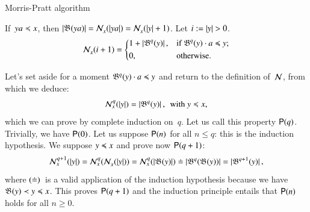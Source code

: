 %
\begin{frame}{Morris-Pratt algorithm}

If~\({ya \mathrel{\preccurlyeq} x}\), then \(\left\lvert\smash{\mathfrak{B}^{}(ya)}\right\rvert =
\mathcal{N}_{x}^{}(\left\lvert\smash{ya}\right\rvert) = \mathcal{N}_{x}^{}(\left\lvert\smash{y}\right\rvert+1)\). Let \(i :=
\left\lvert\smash{y}\right\rvert > 0\).
\begin{equation*}
\mathcal{N}_{x}^{}(i+1) =
\left\{
  \begin{aligned}
   & 1 + \left\lvert\smash{\mathfrak{B}^{q}(y)}\right\rvert,
   && \text{if \(\mathfrak{B}^{q}(y) \cdot a \mathrel{\preccurlyeq}y\)};\\
   & 0,
   && \text{otherwise.}
  \end{aligned}
\right.
\end{equation*}

Let's set aside for a moment \(\mathfrak{B}^{q}(y) \cdot a \mathrel{\preccurlyeq} y\) and
return to the definition of~\(\mathcal{N}\), from which we deduce:
\begin{equation*}
\mathcal{N}_{x}^{q}(\left\lvert\smash{y}\right\rvert) = \left\lvert\smash{\mathfrak{B}^{q}(y)}\right\rvert,
\,\; \text{with \(y \mathrel{\preccurlyeq}x\)},
\end{equation*}
which we can prove by complete induction on~\(q\). Let us call this
property \(\textsf{P}({q})\). Trivially, we have \(\textsf{P}({0})\). Let us
suppose \(\textsf{P}({n})\) for all \(n \leqslant q\): this is the
induction hypothesis. We suppose \(y \mathrel{\preccurlyeq} x\) and prove now
\(\textsf{P}({q+1})\):
\begin{equation*}
  \mathcal{N}_{x}^{q+1}(\left\lvert\smash{y}\right\rvert)
= \mathcal{N}_{x}^{q}(\mathcal{N}_{x}^{}(\left\lvert\smash{y}\right\rvert))
= \mathcal{N}_{x}^{q}(\left\lvert\smash{\mathfrak{B}^{}(y)}\right\rvert)
\doteq \left\lvert\smash{\mathfrak{B}^{q}(\mathfrak{B}^{}(y))}\right\rvert
= \left\lvert\smash{\mathfrak{B}^{q+1}(y)}\right\rvert,
\end{equation*}
where \((\smash{\doteq})\)~is a valid application of the induction
hypothesis because we have \(\mathfrak{B}^{}(y) \mathrel{\prec} y \mathrel{\preccurlyeq} x\). This
proves \(\textsf{P}({q+1})\) and the induction principle entails that
\(\textsf{P}({n})\) holds for all \(n \geqslant 0\).

\end{frame}

